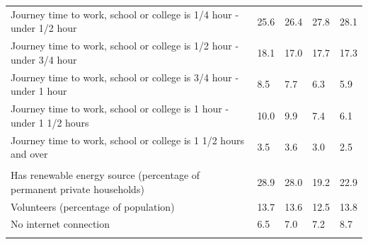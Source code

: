 \documentclass{article}
\begin{document}
\begin{table}[h]
\begin{tabular}{KTTTT}
Journey time to work, school or college is 1/4 hour - under 1/2 hour & 25.6& 26.4& 27.8& 28.1\\
Journey time to work, school or college is 1/2 hour - under 3/4 hour & 18.1& 17.0& 17.7& 17.3\\
Journey time to work, school or college is 3/4 hour - under 1 hour & 8.5& 7.7& 6.3& 5.9\\
Journey time to work, school or college is 1 hour - under 1 1/2 hours & 10.0&  9.9&  7.4&  6.1\\
Journey time to work, school or college is 1 1/2 hours and over & 3.5& 3.6& 3.0& 2.5\\
\hline
    \\ 
    \hline
Has renewable energy source (percentage of permanent private households) & 28.9& 28.0& 19.2& 22.9\\
    \hline
Volunteers (percentage of population) & 13.7& 13.6& 12.5& 13.8\\
    \hline
No internet connection& 6.5& 7.0& 7.2& 8.7\\
\hline
\end{tabular}
\end{table}
\end{document}
